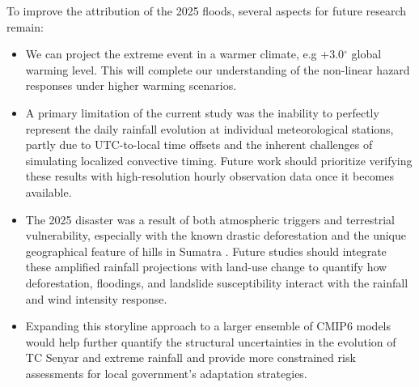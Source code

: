 To improve the attribution of the 2025 floods, several aspects for future research remain:
\begin{itemize}
    \item We can project the extreme event in a warmer climate, e.g +3.0$^\circ$ global warming level. This will complete our understanding of the non-linear hazard responses under higher warming scenarios.
    \item A primary limitation of the current study was the inability to perfectly represent the daily rainfall evolution at individual meteorological stations, partly due to UTC-to-local time offsets and the inherent challenges of simulating localized convective timing. Future work should prioritize verifying these results with high-resolution hourly observation data once it becomes available.
    \item The 2025 disaster was a result of both atmospheric triggers and terrestrial vulnerability, especially with the known drastic deforestation and the unique geographical feature of hills in Sumatra \citep{wu2026analysis, wwa}. Future studies should integrate these amplified rainfall projections with land-use change to quantify how deforestation, floodings, and landslide susceptibility interact with the rainfall and wind intensity response.
    \item Expanding this storyline approach to a larger ensemble of CMIP6 models would help further quantify the structural uncertainties in the evolution of TC Senyar and extreme rainfall and provide more constrained risk assessments for local government’s adaptation strategies.
\end{itemize}